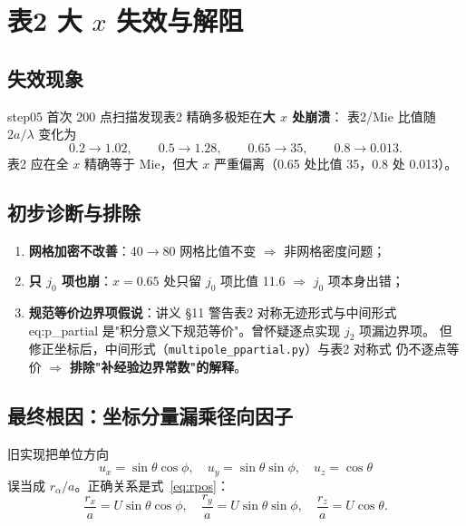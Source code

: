 \section{表2 大 $x$ 失效与解阻}

\subsection{失效现象}

step05 首次 200 点扫描发现表2 精确多极矩在\textbf{大 $x$ 处崩溃}：
表2/Mie 比值随 $2a/\lambda$ 变化为
\begin{equation*}
  0.2\to1.02,\qquad 0.5\to1.28,\qquad 0.65\to35,\qquad 0.8\to0.013.
\end{equation*}
表2 应在全 $x$ 精确等于 Mie，但大 $x$ 严重偏离（0.65 处比值 35，0.8 处 0.013）。

\subsection{初步诊断与排除}

\begin{enumerate}
  \item \textbf{网格加密不改善}：40$\to$80 网格比值不变 $\Rightarrow$ 非网格密度问题；
  \item \textbf{只 $j_0$ 项也崩}：$x=0.65$ 处只留 $j_0$ 项比值 11.6
        $\Rightarrow$ $j_0$ 项本身出错；
  \item \textbf{规范等价边界项假说}：讲义 §11 警告表2 对称无迹形式与中间形式
        eq:p\_partial 是"积分意义下规范等价"。曾怀疑逐点实现 $j_2$ 项漏边界项。
        但修正坐标后，中间形式（\texttt{multipole\_ppartial.py}）与表2 对称式
        仍不逐点等价 $\Rightarrow$ \textbf{排除"补经验边界常数"的解释}。
\end{enumerate}

\subsection{最终根因：坐标分量漏乘径向因子}

旧实现把单位方向
\begin{equation*}
  u_x=\sin\theta\cos\phi,\quad u_y=\sin\theta\sin\phi,\quad u_z=\cos\theta
\end{equation*}
误当成 $r_\alpha/a$。正确关系是式~\eqref{eq:rpos}：
\begin{equation}
  \frac{r_x}{a}=U\sin\theta\cos\phi,\quad
  \frac{r_y}{a}=U\sin\theta\sin\phi,\quad
  \frac{r_z}{a}=U\cos\theta.
  \label{eq:rpos_fix}
\end{equation}

